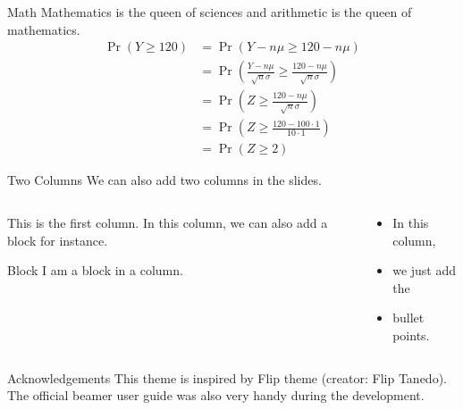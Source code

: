 \documentclass[aspectratio=43]{beamer}
\begin{document}
	\begin{frame}{Math}
		Mathematics is the queen of sciences and arithmetic is the queen of mathematics.
		\begin{align*}
			\Pr(Y \geq 120) &= \Pr\left(Y-n\mu \geq 120-n\mu \right)\\
			&= \Pr\left( \frac{Y-n\mu }{\sqrt{n}\sigma} \geq \frac{120-n\mu }{\sqrt{n}\sigma} \right)\\
			&=\Pr\left( Z \geq \frac{120-n\mu }{\sqrt{n}\sigma} \right)\\
			&=\Pr\left( Z \geq \frac{120-100 \cdot 1 }{10 \cdot 1} \right)\\
			&=\Pr\left( Z \geq 2\right)
		\end{align*}
	\end{frame}

	\begin{frame}{Two Columns}
		We can also add two columns in the slides.
		\begin{columns}[t]
			\begin{column}[T]{0.4\textwidth}
				This is the first column. In this column, we can also add a block for instance.
				\vspace{1em}
				\begin{block}{Block}
					I am a block in a column.
				\end{block}
			\end{column}
			\begin{column}[T]{0.4\textwidth}
				\begin{itemize}
					\item In this column,
					\item we just add the
					\item bullet points.
				\end{itemize}
			\end{column}
		\end{columns}
	\end{frame}
	\begin{frame}{Acknowledgements}
		This theme is inspired by Flip theme (creator: Flip Tanedo). The official beamer user guide was also very handy during the development.
	\end{frame}
\end{document}

